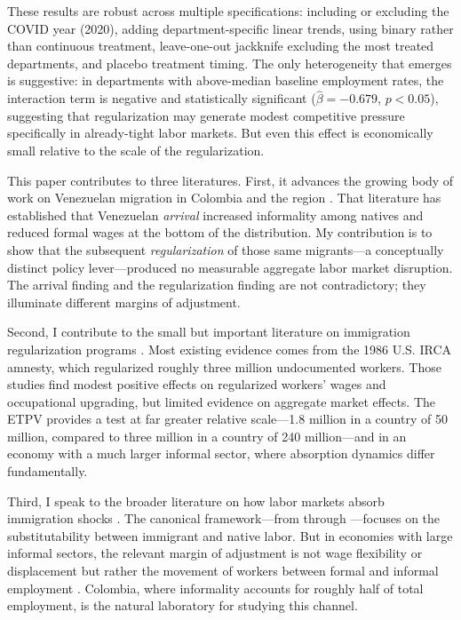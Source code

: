 \documentclass[12pt]{article}
\begin{document}
These results are robust across multiple specifications: including or excluding the COVID year (2020), adding department-specific linear trends, using binary rather than continuous treatment, leave-one-out jackknife excluding the most treated departments, and placebo treatment timing. The only heterogeneity that emerges is suggestive: in departments with above-median baseline employment rates, the interaction term is negative and statistically significant ($\hat{\beta} = -0.679$, $p < 0.05$), suggesting that regularization may generate modest competitive pressure specifically in already-tight labor markets. But even this effect is economically small relative to the scale of the regularization.

This paper contributes to three literatures. First, it advances the growing body of work on Venezuelan migration in Colombia and the region \citep{lebow2023immigration, penaloza2023venezolana, caruso2021spillover, rozo2024displaced}. That literature has established that Venezuelan \textit{arrival} increased informality among natives and reduced formal wages at the bottom of the distribution. My contribution is to show that the subsequent \textit{regularization} of those same migrants---a conceptually distinct policy lever---produced no measurable aggregate labor market disruption. The arrival finding and the regularization finding are not contradictory; they illuminate different margins of adjustment.

Second, I contribute to the small but important literature on immigration regularization programs \citep{clemens2018immigration, kossoudji2002coming, cobb2012immigration, amuedo2020immigration, monras2020immigration}. Most existing evidence comes from the 1986 U.S. IRCA amnesty, which regularized roughly three million undocumented workers. Those studies find modest positive effects on regularized workers' wages and occupational upgrading, but limited evidence on aggregate market effects. The ETPV provides a test at far greater relative scale---1.8 million in a country of 50 million, compared to three million in a country of 240 million---and in an economy with a much larger informal sector, where absorption dynamics differ fundamentally.

Third, I speak to the broader literature on how labor markets absorb immigration shocks \citep{borjas2017immigration, clemens2019immigration, card2001immigrant}. The canonical framework---from \citet{borjas2003labor} through \citet{dustmann2017labour}---focuses on the substitutability between immigrant and native labor. But in economies with large informal sectors, the relevant margin of adjustment is not wage flexibility or displacement but rather the movement of workers between formal and informal employment \citep{ulyssea2020informality, meghir2015wages}. Colombia, where informality accounts for roughly half of total employment, is the natural laboratory for studying this channel.
\end{document}
